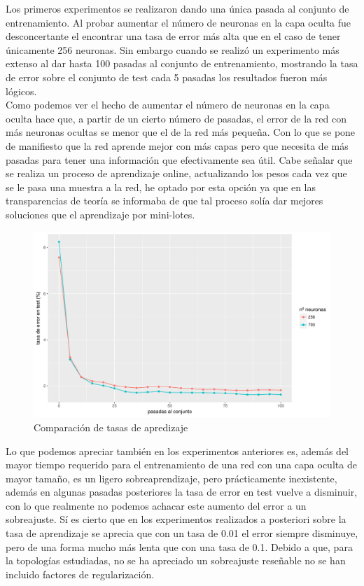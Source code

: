 \documentclass[10pt,a4paper]{article}
\begin{document}
Los primeros experimentos se realizaron dando una única pasada al conjunto de entrenamiento. Al probar aumentar el número de neuronas en la capa oculta fue desconcertante el encontrar una tasa de error más alta que en el caso de tener únicamente 256 neuronas. Sin embargo cuando se realizó un experimento más extenso al dar hasta 100 pasadas al conjunto de entrenamiento, mostrando la tasa de error sobre el conjunto de test cada 5 pasadas los resultados fueron más lógicos.\\

Como podemos ver el hecho de aumentar el número de neuronas en la capa oculta hace que, a partir de un cierto número de pasadas, el error de la red con más neuronas ocultas se menor que el de la red más pequeña. Con lo que se pone de manifiesto que la red aprende mejor con más capas pero que necesita de más pasadas para tener una información que efectivamente sea útil. Cabe señalar que se realiza un proceso de aprendizaje online, actualizando los pesos cada vez que se le pasa una muestra a la red, he optado por esta opción ya que en las transparencias de teoría se informaba de que tal proceso solía dar mejores soluciones que el aprendizaje por mini-lotes.

\begin{figure}[H]
\includegraphics[scale=0.5]{img/cantidad.pdf}
\caption{Comparación de tasas de apredizaje}
\end{figure}

Lo que podemos apreciar también en los experimentos anteriores es, además del mayor tiempo requerido para el entrenamiento de una red con una capa oculta de mayor tamaño, es un ligero sobreaprendizaje, pero prácticamente inexistente, además en algunas pasadas posteriores la tasa de error en test vuelve a disminuir, con lo que realmente no podemos achacar este aumento del error a un sobreajuste. Sí es cierto que en los experimentos realizados a posteriori sobre la tasa de aprendizaje se aprecia que con un tasa de 0.01 el error siempre disminuye, pero de una forma mucho más lenta que con una tasa de 0.1. Debido a que, para la topologías estudiadas, no se ha apreciado un sobreajuste reseñable no se han incluido factores de regularización.\\
\end{document}
